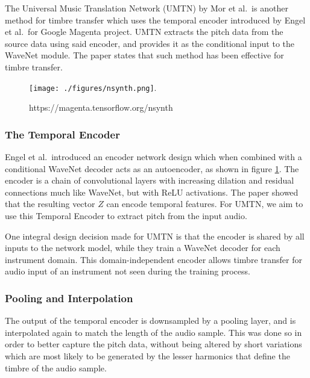\documentclass[12pt,a4paper,]{report}
\begin{document}
The Universal Music Translation Network (UMTN) by Mor et al.~is another
method for timbre transfer which uses the temporal encoder introduced by
Engel et al.~for Google Magenta project. UMTN extracts the pitch data
from the source data using said encoder, and provides it as the
conditional input to the WaveNet module. The paper states that such
method has been effective for timbre transfer.

\begin{figure}[h]
    \texttt{[image: ./figures/nsynth.png]}.
    \centering
    \caption{https://magenta.tensorflow.org/nsynth \label{fig:nsynth}}
\end{figure}

\hypertarget{the-temporal-encoder}{%
\subsubsection{The Temporal Encoder}\label{the-temporal-encoder}}

Engel et al.~introduced an encoder network design which when combined
with a conditional WaveNet decoder acts as an autoencoder, as shown in
figure \ref{fig:nsynth}. The encoder is a chain of convolutional layers
with increasing dilation and residual connections much like WaveNet, but
with ReLU activations. The paper showed that the resulting vector \(Z\)
can encode temporal features. For UMTN, we aim to use this Temporal
Encoder to extract pitch from the input audio.

One integral design decision made for UMTN is that the encoder is shared
by all inputs to the network model, while they train a WaveNet decoder
for each instrument domain. This domain-independent encoder allows
timbre transfer for audio input of an instrument not seen during the
training process.

\hypertarget{pooling-and-interpolation}{%
\subsubsection{Pooling and
Interpolation}\label{pooling-and-interpolation}}

The output of the temporal encoder is downsampled by a pooling layer,
and is interpolated again to match the length of the audio sample. This
was done so in order to better capture the pitch data, without being
altered by short variations which are most likely to be generated by the
lesser harmonics that define the timbre of the audio sample.
\end{document}

